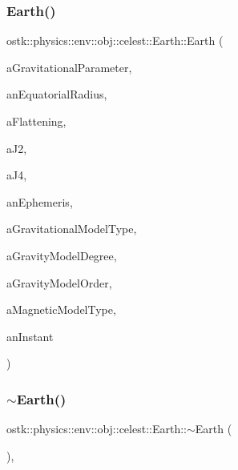 \subsubsection{\texorpdfstring{Earth()}{Earth()}\hspace{0.1cm}{\footnotesize\ttfamily [2/2]}}
{\footnotesize\ttfamily ostk\+::physics\+::env\+::obj\+::celest\+::\+Earth\+::\+Earth (\begin{DoxyParamCaption}\item[{const \hyperlink{classostk_1_1physics_1_1units_1_1_derived}{Derived} \&}]{a\+Gravitational\+Parameter,  }\item[{const \hyperlink{classostk_1_1physics_1_1units_1_1_length}{Length} \&}]{an\+Equatorial\+Radius,  }\item[{const Real \&}]{a\+Flattening,  }\item[{const Real \&}]{a\+J2,  }\item[{const Real \&}]{a\+J4,  }\item[{const Shared$<$ \hyperlink{classostk_1_1physics_1_1env_1_1_ephemeris}{Ephemeris} $>$ \&}]{an\+Ephemeris,  }\item[{const \hyperlink{classostk_1_1physics_1_1environment_1_1gravitational_1_1_earth_a9895df78b5c5aab5e981bf765f8c0f05}{Earth\+Gravitational\+Model\+::\+Type} \&}]{a\+Gravitational\+Model\+Type,  }\item[{const Integer \&}]{a\+Gravity\+Model\+Degree,  }\item[{const Integer \&}]{a\+Gravity\+Model\+Order,  }\item[{const \hyperlink{classostk_1_1physics_1_1environment_1_1magnetic_1_1_earth_a30a064d87b6fce338e76aebd3043b6b6}{Earth\+Magnetic\+Model\+::\+Type} \&}]{a\+Magnetic\+Model\+Type,  }\item[{const \hyperlink{classostk_1_1physics_1_1time_1_1_instant}{Instant} \&}]{an\+Instant }\end{DoxyParamCaption})}

\mbox{\label{classostk_1_1physics_1_1env_1_1obj_1_1celest_1_1_earth_ac718f964c68fa41331978751a9ca4818}} 
\subsubsection{\texorpdfstring{$\sim$\+Earth()}{~Earth()}}
{\footnotesize\ttfamily ostk\+::physics\+::env\+::obj\+::celest\+::\+Earth\+::$\sim$\+Earth (\begin{DoxyParamCaption}{ }\end{DoxyParamCaption})\hspace{0.3cm}{\ttfamily [override]}, {\ttfamily [virtual]}}



